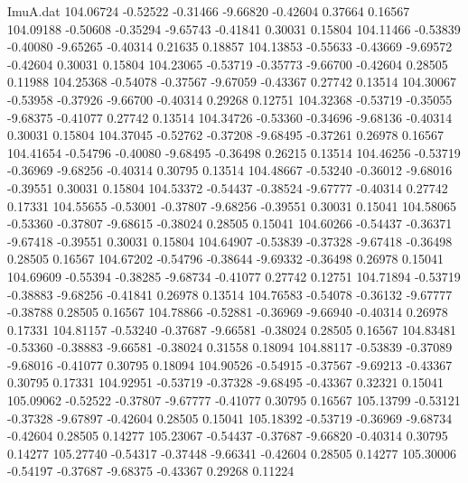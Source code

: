 \begin{filecontents}{ImuA.dat}
 104.06724   -0.52522   -0.31466   -9.66820   -0.42604    0.37664    0.16567
 104.09188   -0.50608   -0.35294   -9.65743   -0.41841    0.30031    0.15804
 104.11466   -0.53839   -0.40080   -9.65265   -0.40314    0.21635    0.18857
 104.13853   -0.55633   -0.43669   -9.69572   -0.42604    0.30031    0.15804
 104.23065   -0.53719   -0.35773   -9.66700   -0.42604    0.28505    0.11988
 104.25368   -0.54078   -0.37567   -9.67059   -0.43367    0.27742    0.13514
 104.30067   -0.53958   -0.37926   -9.66700   -0.40314    0.29268    0.12751
 104.32368   -0.53719   -0.35055   -9.68375   -0.41077    0.27742    0.13514
 104.34726   -0.53360   -0.34696   -9.68136   -0.40314    0.30031    0.15804
 104.37045   -0.52762   -0.37208   -9.68495   -0.37261    0.26978    0.16567
 104.41654   -0.54796   -0.40080   -9.68495   -0.36498    0.26215    0.13514
 104.46256   -0.53719   -0.36969   -9.68256   -0.40314    0.30795    0.13514
 104.48667   -0.53240   -0.36012   -9.68016   -0.39551    0.30031    0.15804
 104.53372   -0.54437   -0.38524   -9.67777   -0.40314    0.27742    0.17331
 104.55655   -0.53001   -0.37807   -9.68256   -0.39551    0.30031    0.15041
 104.58065   -0.53360   -0.37807   -9.68615   -0.38024    0.28505    0.15041
 104.60266   -0.54437   -0.36371   -9.67418   -0.39551    0.30031    0.15804
 104.64907   -0.53839   -0.37328   -9.67418   -0.36498    0.28505    0.16567
 104.67202   -0.54796   -0.38644   -9.69332   -0.36498    0.26978    0.15041
 104.69609   -0.55394   -0.38285   -9.68734   -0.41077    0.27742    0.12751
 104.71894   -0.53719   -0.38883   -9.68256   -0.41841    0.26978    0.13514
 104.76583   -0.54078   -0.36132   -9.67777   -0.38788    0.28505    0.16567
 104.78866   -0.52881   -0.36969   -9.66940   -0.40314    0.26978    0.17331
 104.81157   -0.53240   -0.37687   -9.66581   -0.38024    0.28505    0.16567
 104.83481   -0.53360   -0.38883   -9.66581   -0.38024    0.31558    0.18094
 104.88117   -0.53839   -0.37089   -9.68016   -0.41077    0.30795    0.18094
 104.90526   -0.54915   -0.37567   -9.69213   -0.43367    0.30795    0.17331
 104.92951   -0.53719   -0.37328   -9.68495   -0.43367    0.32321    0.15041
 105.09062   -0.52522   -0.37807   -9.67777   -0.41077    0.30795    0.16567
 105.13799   -0.53121   -0.37328   -9.67897   -0.42604    0.28505    0.15041
 105.18392   -0.53719   -0.36969   -9.68734   -0.42604    0.28505    0.14277
 105.23067   -0.54437   -0.37687   -9.66820   -0.40314    0.30795    0.14277
 105.27740   -0.54317   -0.37448   -9.66341   -0.42604    0.28505    0.14277
 105.30006   -0.54197   -0.37687   -9.68375   -0.43367    0.29268    0.11224

\end{filecontents}
